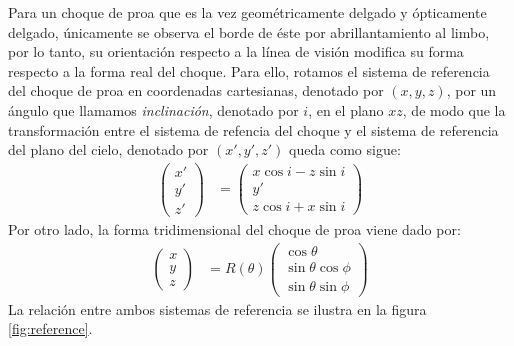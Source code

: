 Para un choque de proa que es la vez geométricamente delgado y ópticamente delgado, únicamente se observa el borde de éste por
abrillantamiento al limbo, por lo tanto, su orientación respecto a la línea de visión modifica su forma respecto a la forma real del
choque. Para ello, rotamos el sistema de referencia del choque de proa en coordenadas cartesianas, denotado por $(x, y, z)$, por un ángulo que llamamos \textit{inclinación}, denotado por $i$, en el plano $xz$, de modo que la transformación entre el sistema de refencia del choque y el sistema de referencia del plano del cielo, denotado por
$(x', y', z')$ queda como sigue:
\begin{align}
  \left(
  \begin{array}{c}
    x' \\ y' \\ z'
  \end{array}
  \right) &=
  \left(
  \begin{array}{c}
    x\cos i - z\sin i \\ y' \\ z\cos i + x\sin i
  \end{array}
  \right)
  \label{eq:rotation}
\end{align}
Por otro lado, la forma tridimensional del choque de proa viene dado por:
\begin{align}
  \left(
  \begin{array}{c}
    x \\ y \\ z
  \end{array}
  \right) &=
            R(\theta)\left(
            \begin{array}{c}
              \cos\theta \\
              \sin\theta\cos\phi \\
              \sin\theta\sin\phi
            \end{array}
            \right)
\end{align}
La relación entre ambos sistemas de referencia se ilustra en la figura \ref{fig:reference}.
